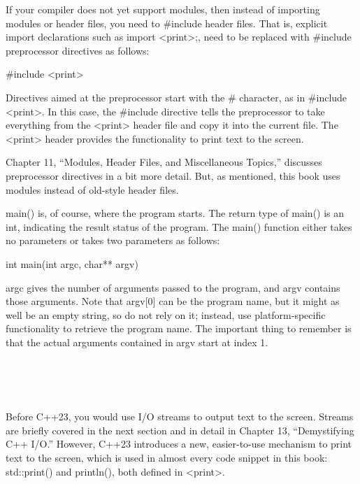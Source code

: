 
If your compiler does not yet support modules, then instead of importing modules or header files, you need to \#include header files. That is, explicit import declarations such as import <print>;, need to be replaced with \#include preprocessor directives as follows:

\begin{cpp}
#include <print>
\end{cpp}

Directives aimed at the preprocessor start with the \# character, as in \#include <print>. In this case, the \#include directive tells the preprocessor to take everything from the <print> header file and copy it into the current file. The <print> header provides the functionality to print text to the screen.

Chapter 11, “Modules, Header Files, and Miscellaneous Topics,” discusses preprocessor directives in a bit more detail. But, as mentioned, this book uses modules instead of old-style header files.


main() is, of course, where the program starts. The return type of main() is an int, indicating the result status of the program. The main() function either takes no parameters or takes two parameters as follows:

\begin{cpp}
int main(int argc, char** argv)
\end{cpp}

argc gives the number of arguments passed to the program, and argv contains those arguments. Note that argv[0] can be the program name, but it might as well be an empty string, so do not rely on it; instead, use platform-specific functionality to retrieve the program name. The important thing to remember is that the actual arguments contained in argv start at index 1.

\hspace*{\fill} \\ %
\hspace*{\fill} \\ %
\hspace*{\fill} \\ %



Before C++23, you would use I/O streams to output text to the screen. Streams are briefly covered in the next section and in detail in Chapter 13, “Demystifying C++ I/O.” However, C++23 introduces a new, easier-to-use mechanism to print text to the screen, which is used in almost every code snippet in this book: std::print() and println(), both defined in <print>.

